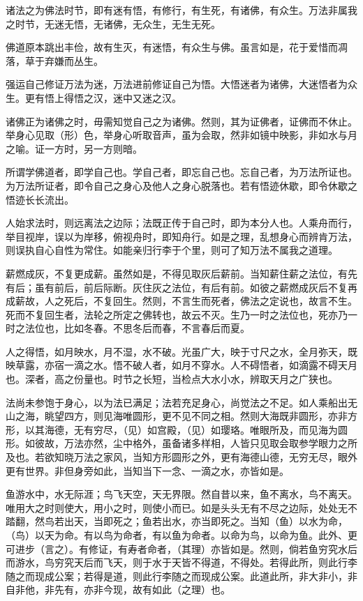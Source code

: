 


诸法之为佛法时节，即有迷有悟，有修行，有生死，有诸佛，有众生。万法非属我之时节，无迷无悟，无诸佛，无众生，无生无死。

佛道原本跳出丰俭，故有生灭，有迷悟，有众生与佛。虽言如是，花于爱惜而凋落，草于弃嫌而丛生。

强运自己修证万法为迷，万法进前修证自己为悟。大悟迷者为诸佛，大迷悟者为众生。更有悟上得悟之汉，迷中又迷之汉。

诸佛正为诸佛之时，毋需知觉自己之为诸佛。然则，其为证佛者，证佛而不休止。举身心见取（形）色，举身心听取音声，虽为会取，然非如镜中映影，非如水与月之喻。证一方时，另一方则暗。

所谓学佛道者，即学自己也。学自己者，即忘自己也。忘自己者，为万法所证也。为万法所证者，即令自己之身心及他人之身心脱落也。若有悟迹休歇，即令休歇之悟迹长长流出。

人始求法时，则远离法之边际；法既正传于自己时，即为本分人也。人乘舟而行，举目视岸，误以为岸移，俯视舟时，即知舟行。如是之理，乱想身心而辨肯万法，则误执自心自性为常住。如能亲归行李于个里，则可了知万法不属我之道理。

薪燃成灰，不复更成薪。虽然如是，不得见取灰后薪前。当知薪住薪之法位，有先有后；虽有前后，前后际断。灰住灰之法位，有后有前。如彼之薪燃成灰后不复再成薪故，人之死后，不复回生。然则，不言生而死者，佛法之定说也，故言不生。死而不复回生者，法轮之所定之佛转也，故云不灭。生乃一时之法位也，死亦乃一时之法位也，比如冬春。不思冬后而春，不言春后而夏。

人之得悟，如月映水，月不湿，水不破。光虽广大，映于寸尺之水，全月弥天，既映草露，亦宿一滴之水。悟不破人者，如月不穿水。人不碍悟者，如滴露不碍天月也。深者，高之份量也。时节之长短，当检点大水小水，辨取天月之广狭也。

法尚未参饱于身心，以为法已满足；法若充足身心，尚觉法之不足。如人乘船出无山之海，眺望四方，则见海唯圆形，更不见不同之相。然则大海既非圆形，亦非方形，以其海德，无有穷尽，（见）如宫殿，（见）如璎珞。唯眼所及，而见海为圆形。如彼故，万法亦然，尘中格外，虽备诸多样相，人皆只见取会取参学眼力之所及也。若欲知晓万法之家风，当知方形圆形之外，更有海德山德，无穷无尽，眼外更有世界。非但身旁如此，当知当下一念、一滴之水，亦皆如是。

鱼游水中，水无际涯；鸟飞天空，天无界限。然自昔以来，鱼不离水，鸟不离天。唯用大之时则使大，用小之时，则使小而已。如是头头无有不尽之边际，处处无不踏翻，然鸟若出天，当即死之；鱼若出水，亦当即死之。当知（鱼）以水为命，（鸟）以天为命。有以鸟为命者，有以鱼为命者。以命为鸟，以命为鱼。此外、更可进步（言之）。有修证，有寿者命者，（其理）亦皆如是。然则，倘若鱼穷究水后而游水，鸟穷究天后而飞天，则于水于天皆不得道，不得处。若得此所，则此行李随之而现成公案；若得是道，则此行李随之而现成公案。此道此所，非大非小，非自非他，非先有，亦非今现，故有如此（之理）也。

